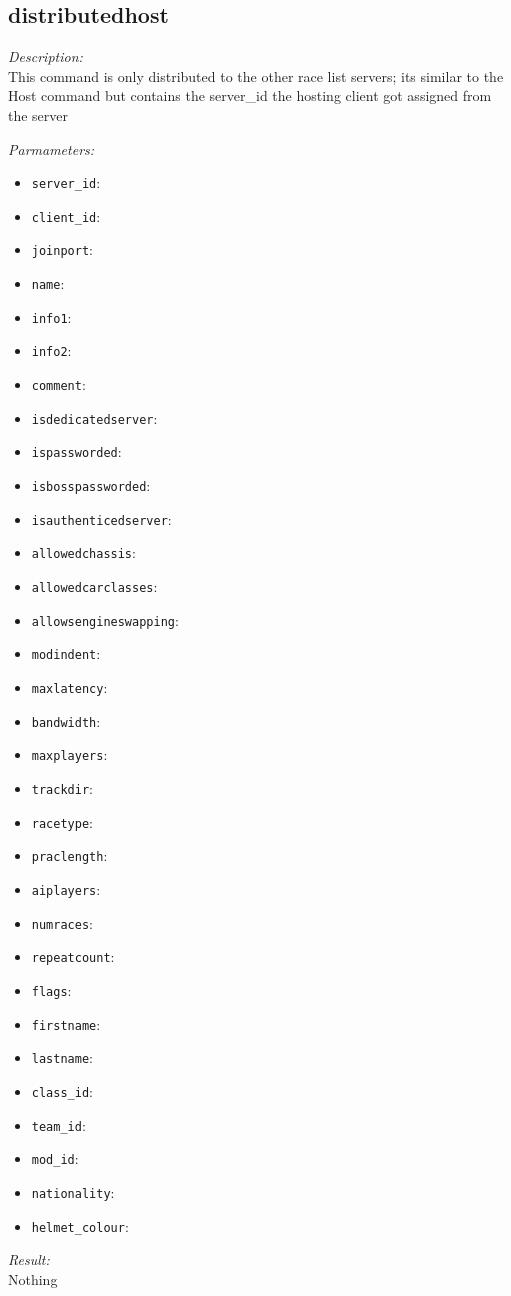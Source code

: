 \subsection{distributedhost}

\begin{description}
\item {\it Description:}\\
This command is only distributed to the other race list servers; its similar to the Host command but contains the server\_id the hosting client got assigned from the server
\item {\it Parmameters:}
\begin{itemize}
\item {\tt server\_id}: 
\item {\tt client\_id}: 
\item {\tt joinport}: 
\item {\tt name}: 
\item {\tt info1}: 
\item {\tt info2}: 
\item {\tt comment}: 
\item {\tt isdedicatedserver}: 
\item {\tt ispassworded}: 
\item {\tt isbosspassworded}: 
\item {\tt isauthenticedserver}: 
\item {\tt allowedchassis}: 
\item {\tt allowedcarclasses}: 
\item {\tt allowsengineswapping}: 
\item {\tt modindent}: 
\item {\tt maxlatency}: 
\item {\tt bandwidth}: 
\item {\tt maxplayers}: 
\item {\tt trackdir}: 
\item {\tt racetype}: 
\item {\tt praclength}: 
\item {\tt aiplayers}: 
\item {\tt numraces}: 
\item {\tt repeatcount}: 
\item {\tt flags}: 
\item {\tt firstname}: 
\item {\tt lastname}: 
\item {\tt class\_id}: 
\item {\tt team\_id}: 
\item {\tt mod\_id}: 
\item {\tt nationality}: 
\item {\tt helmet\_colour}: 
\end{itemize}
\item {\it Result:}\\
Nothing
\end{description}

